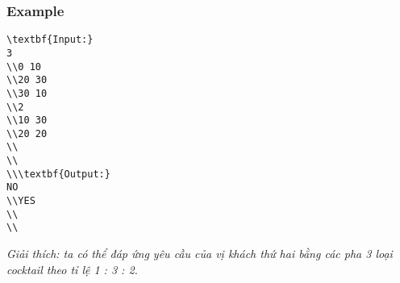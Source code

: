\subsubsection{   Example  }
\begin{verbatim}
\textbf{Input:}
3
\\0 10
\\20 30 
\\30 10
\\2
\\10 30
\\20 20
\\
\\
\\\textbf{Output:}
NO
\\YES
\\
\\\end{verbatim}

\emph{    Giải thích: ta có thể đáp ứng yêu cầu của vị khách thứ hai bằng các pha 3 loại cocktail theo tỉ lệ 1 : 3 : 2.   }